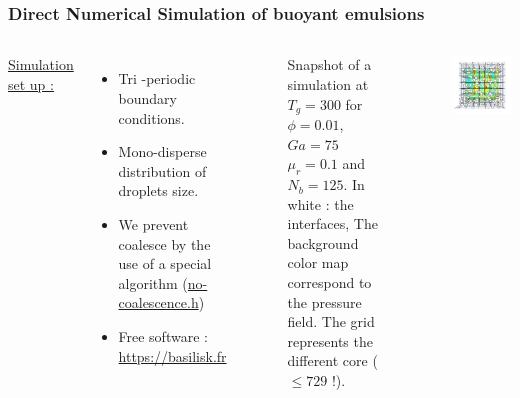 \documentclass{sintefbeamer}
\begin{document}
\section*{}
\begin{frame}
\frametitle{Direct Numerical Simulation of buoyant emulsions}
\begin{columns}
\underline{Simulation set up :} 
\begin{itemize}
  \item Tri -periodic boundary conditions. 
  \item Mono-disperse distribution of droplets size.
  \item We prevent coalesce by the use of a special algorithm 
  (\href{http://basilisk.fr/sandbox/fintzin/Rising-Suspension/no-coalescence.h}{no-coalescence.h})
  \item Free software : \url{https://basilisk.fr}
\end{itemize}

\begin{figure}
  \caption{Snapshot of a simulation at $T_g = 300$ for $\phi = 0.01$, $Ga = 75$ $\mu_r = 0.1$ and $N_b = 125$. In white : the interfaces, The background color map correspond to the pressure field. The grid represents the different core ($\le 729$ !).
  }
\end{figure}
\centering
\includegraphics[width =  1.1\textwidth]{image/PHI_01_Ga_75.png}
\end{columns}
\end{frame}
\end{document}
